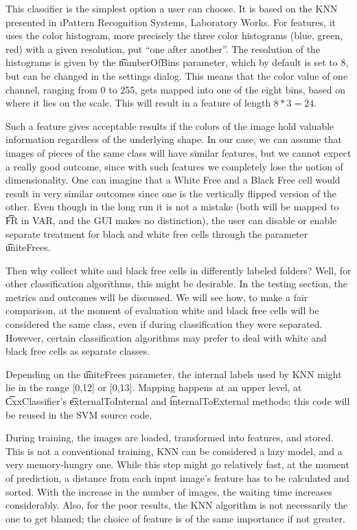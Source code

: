 This classifier is the simplest option a user can choose. It is based on the KNN presented in \i{Pattern Recognition Systems, Laboratory Works}\cite{prs_labs}. For features, it uses the color histogram, more precisely the three color histograms (blue, green, red) with a given resolution, put ``one after another''. The resolution of the histograms is given by the \t{numberOfBins} parameter, which by default is set to 8, but can be changed in the settings dialog. This means that the color value of one channel, ranging from 0 to 255, gets mapped into one of the eight bins, based on where it lies on the scale. This will result in a feature of length $8 * 3 = 24$.

Such a feature gives acceptable results if the colors of the image hold valuable information regardless of the underlying shape. In our case, we can assume that images of pieces of the same class will have similar features, but we cannot expect a really good outcome, since with such features we completely lose the notion of dimensionality. One can imagine that a White Free and a Black Free cell would result in very similar outcomes since one is the vertically flipped version of the other. Even though in the long run it is not a mistake (both will be mapped to \t{FR} in VAR, and the GUI makes no distinction), the user can disable or enable separate treatment for black and white free cells through the parameter \t{uniteFrees}.

Then why collect white and black free cells in differently labeled folders? Well, for other classification algorithms, this might be desirable. In the testing section, the metrics and outcomes will be discussed. We will see how, to make a fair comparison, at the moment of evaluation white and black free cells will be considered the same class, even if during classification they were separated. However, certain classification algorithms may prefer to deal with white and black free cells as separate classes.

Depending on the \t{uniteFrees} parameter, the internal labels used by KNN might lie in the range [0,12] or [0,13]. Mapping happens at an upper level, at \t{CxxClassifier}'s \t{externalToInternal} and \t{internalToExternal} methods; this code will be reused in the SVM source code.

During training, the images are loaded, transformed into features, and stored. This is not a conventional training, KNN can be considered a lazy model, and a very memory-hungry one. While this step might go relatively fast, at the moment of prediction, a distance from each input image's feature has to be calculated and sorted. With the increase in the number of images, the waiting time increases considerably. Also, for the poor results, the KNN algorithm is not necessarily the one to get blamed; the choice of feature is of the same importance if not greater.


